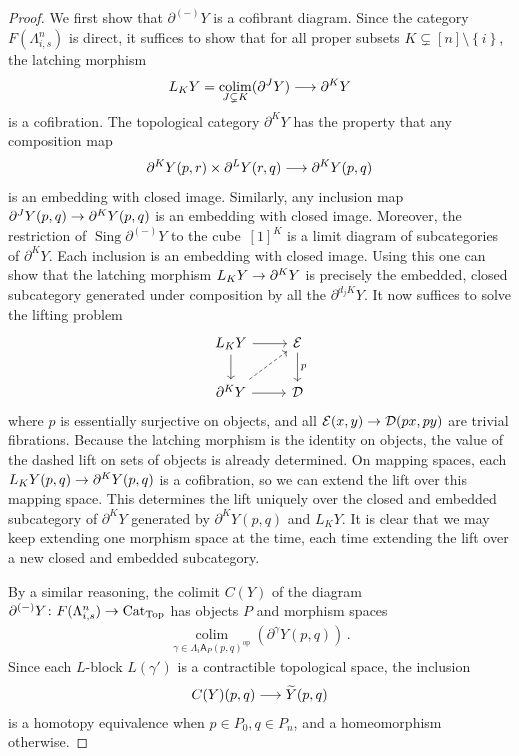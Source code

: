 \documentclass[10pt]{amsart}
\numberwithin{equation}{section}
\theoremstyle{definition}
\DeclareMathOperator{\Sing}{Sing}
\DeclareMathOperator{\op}{op}
\DeclareMathOperator{\Top}{Top}
\DeclareMathOperator*{\colim}{colim}
\newcommand{\Cat}{\mathrm{Cat}\vphantom{t}}
\newcommand{\Horn}{\Lambda}
\newcommand{\cE}{\mathcal{E}}
\newcommand{\calD}{\mathcal{D}}
\newcommand{\sfA}{\mathsf{A}}
\newcommand{\del}{\partial}
\renewcommand{\to}{\mathchoice{\longrightarrow}{\rightarrow}{}{}}
\begin{document}
\begin{proof}
	We first show that $\del^{(-)}Y$ is a cofibrant diagram.
  Since the category $F(\Horn_{i,s}^{n})$ is direct, it suffices to show that for all proper subsets $K\subsetneq [n]\setminus \left\{ i\right\}$, the latching morphism
	\begin{align*}
		L_{K} Y = \colim_{J \subsetneq K}(\del^{J} Y) \to \del^{K} Y
	\end{align*}
	is a cofibration.
  The topological category $\del^{K} Y$ has the property that any composition map
	\begin{align*}
		\del^{K}Y(p,r) \times \del^{L}Y(r,q) \to \del^{K}Y(p,q)
	\end{align*}
	is an embedding with closed image.
  Similarly, any inclusion map $\del^{J}Y(p,q) \to \del^{K}Y(p,q)$ is an embedding with closed image.
  Moreover, the restriction of $\Sing \del^{(-)}Y$ to the cube~$[1]^{K}$ is a limit diagram of subcategories of $ \del^{K}Y$.
  Each inclusion is an embedding with closed image.
  Using this one can show that the latching morphism $L_{K}Y\to \del^{K}Y$ is precisely the embedded, closed subcategory generated under composition by all the $\del^{d_{j}K}Y$.
  It now suffices to solve the lifting problem
	\begin{equation*}
		\begin{tikzcd}
			L_{K}Y \arrow[r] \arrow[d]      &   \cE  \arrow[d,"p"] \\
			\del^{K} Y  \arrow[r] \arrow[ur,dashed]              &  \calD
		\end{tikzcd}
	\end{equation*}
	where $p$ is essentially surjective on objects, and all $\cE(x,y) \to \calD(px,py)$ are trivial fibrations.
  Because the latching morphism is the identity on objects, the value of the dashed lift on sets of objects is already determined.
  On mapping spaces, each $L_{K}Y(p,q) \to \del^{K}Y(p,q)$ is a cofibration, so we can extend the lift over this mapping space.
  This determines the lift uniquely over the closed and embedded subcategory of $\del^{K}Y$ generated by $\del^{K}Y(p,q)$ and $L_{K}Y$.
  It is clear that we may keep extending one morphism space at the time, each time extending the lift over a new closed and embedded subcategory.

	By a similar reasoning, the colimit $C(Y)$ of the diagram $\del^{(-)}Y\colon F(\Horn_{i,s}^{n}) \to \Cat_{\Top}$ has objects $P$ and morphism spaces
	\begin{align*}
		\underset{\gamma \in \Horn_{i} \sfA_{P}(p,q)^{\op}}{\colim}( \del^{\gamma}Y(p,q)) \,.
	\end{align*}
	Since each $L$-block $L(\gamma')$ is a contractible topological space, the inclusion
	\begin{align*}
		C(Y)(p,q) \to \widetilde{Y}(p,q)
	\end{align*}
	is a homotopy equivalence when $p\in P_{0}, q\in P_{n}$, and a homeomorphism otherwise.
\end{proof}
\end{document}
